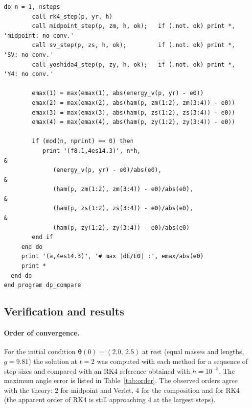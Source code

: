 \documentclass[11pt,a4paper]{book}
\theoremstyle{definition}
\theoremstyle{remark}
\begin{document}
\begin{lstlisting}[language={[95]Fortran},basicstyle=\ttfamily\scriptsize]
     do n = 1, nsteps
        call rk4_step(p, yr, h)
        call midpoint_step(p, zm, h, ok);   if (.not. ok) print *, 'midpoint: no conv.'
        call sv_step(p, zs, h, ok);         if (.not. ok) print *, 'SV: no conv.'
        call yoshida4_step(p, zy, h, ok);   if (.not. ok) print *, 'Y4: no conv.'

        emax(1) = max(emax(1), abs(energy_v(p, yr) - e0))
        emax(2) = max(emax(2), abs(ham(p, zm(1:2), zm(3:4)) - e0))
        emax(3) = max(emax(3), abs(ham(p, zs(1:2), zs(3:4)) - e0))
        emax(4) = max(emax(4), abs(ham(p, zy(1:2), zy(3:4)) - e0))

        if (mod(n, nprint) == 0) then
           print '(f8.1,4es14.3)', n*h,                                 &
              (energy_v(p, yr) - e0)/abs(e0),                           &
              (ham(p, zm(1:2), zm(3:4)) - e0)/abs(e0),                  &
              (ham(p, zs(1:2), zs(3:4)) - e0)/abs(e0),                  &
              (ham(p, zy(1:2), zy(3:4)) - e0)/abs(e0)
        end if
     end do
     print '(a,4es14.3)', '# max |dE/E0| :', emax/abs(e0)
     print *
  end do
end program dp_compare
\end{lstlisting}

\subsection{Verification and results}
\label{sec:results}

\paragraph{Order of convergence.} For the initial condition $\bm\theta(0)=(2.0,\,2.5)$ at rest
(equal masses and lengths, $g=9.81$) the solution at $t=2$ was computed with each method for a sequence of step
sizes and compared with an RK4 reference obtained with $h=10^{-5}$. The maximum angle error is listed in
Table~\ref{tab:order}. The observed orders agree with the theory: 2 for midpoint and Verlet, 4 for the composition
and for RK4 (the apparent order of RK4 is still approaching 4 at the largest steps).
\end{document}
